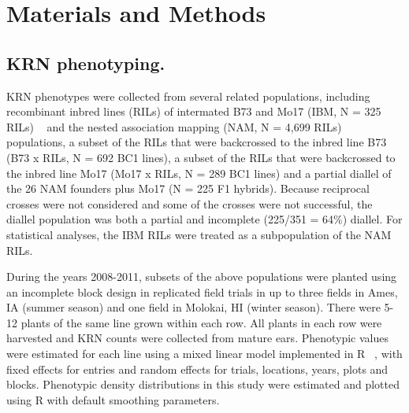 \documentclass[10pt,letterpaper]{article}
\begin{document}

\section*{Materials and Methods}
\subsection*{KRN phenotyping.}

KRN phenotypes were collected from several related populations, including recombinant inbred lines (RILs) of intermated B73 and Mo17 (IBM, N = 325 RILs) ~\cite{Lee2002} and the nested association mapping (NAM, N = 4,699 RILs) ~\cite{Yu2008} populations, a subset of the RILs that were backcrossed to the inbred line B73 (B73 x RILs, N = 692 BC1 lines), a subset of the RILs that were backcrossed to the inbred line Mo17 (Mo17 x RILs, N = 289 BC1 lines) and a partial diallel of the 26 NAM founders plus Mo17 (N = 225 F1 hybrids). Because reciprocal crosses were not considered and some of the crosses were not successful, the diallel population was both a partial and incomplete (225/351 = 64\%) diallel. For statistical analyses, the IBM RILs were treated as a subpopulation of the NAM RILs.

During the years 2008-2011, subsets of the above populations were planted using an incomplete block design in replicated field trials in up to three fields in Ames, IA (summer season) and one field in Molokai, HI (winter season). There were 5-12 plants of the same line grown within each row. All plants in each row were harvested and KRN counts were collected from mature ears. Phenotypic values were estimated for each line using a mixed linear model implemented in R ~\cite{DevelopmentCoreTeam2011}, with fixed effects for entries and random effects for trials, locations, years, plots and blocks. Phenotypic density distributions in this study were estimated and plotted using R with default smoothing parameters. 
\end{document}
